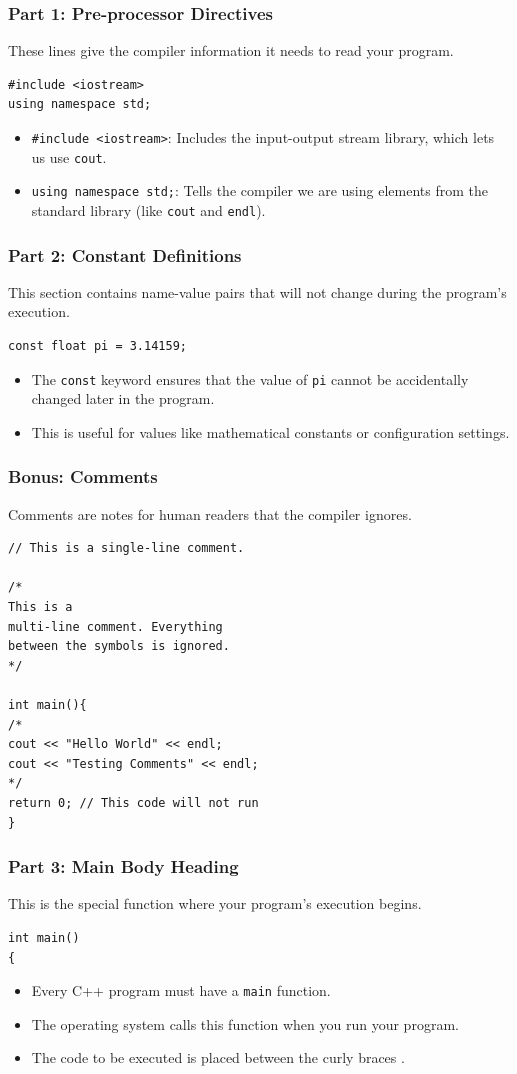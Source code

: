\documentclass{beamer}
\begin{document}
\begin{frame}[fragile]
\frametitle{Part 1: Pre-processor Directives}
These lines give the compiler information it needs to read your program.
\begin{lstlisting}
#include <iostream>
using namespace std;
\end{lstlisting}
\begin{itemize}
\item \texttt{#include <iostream>}: Includes the input-output stream library, which lets us use \texttt{cout}.
\item \texttt{using namespace std;}: Tells the compiler we are using elements from the standard library (like \texttt{cout} and \texttt{endl}).
\end{itemize}
\end{frame}

\begin{frame}[fragile]
\frametitle{Part 2: Constant Definitions}
This section contains name-value pairs that will not change during the program's execution.
\begin{lstlisting}
const float pi = 3.14159;
\end{lstlisting}
\begin{itemize}
\item The \texttt{const} keyword ensures that the value of \texttt{pi} cannot be accidentally changed later in the program.
\item This is useful for values like mathematical constants or configuration settings.
\end{itemize}
\end{frame}

\begin{frame}[fragile]
\frametitle{Bonus: Comments}
Comments are notes for human readers that the compiler ignores.
\begin{lstlisting}
// This is a single-line comment.

/*
This is a
multi-line comment. Everything
between the symbols is ignored.
*/

int main(){
/*
cout << "Hello World" << endl;
cout << "Testing Comments" << endl;
*/
return 0; // This code will not run
}
\end{lstlisting}
\end{frame}

\begin{frame}[fragile]
\frametitle{Part 3: Main Body Heading}
This is the special function where your program's execution begins.
\begin{lstlisting}
int main()
{
\end{lstlisting}
\begin{itemize}
\item Every C++ program must have a \texttt{main} function.
\item The operating system calls this function when you run your program.
\item The code to be executed is placed between the curly braces \texttt{{}}.
\end{itemize}
\end{frame}
\end{document}
